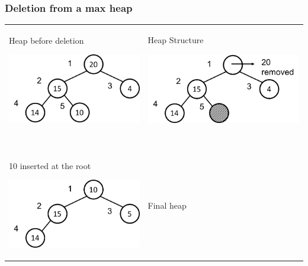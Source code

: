 \documentclass[newPxFont,sthlmFooter,nooffset]{beamer}
\begin{document}
\begin{frame}[t]
  \frametitle{Deletion from a max heap}
  \begin{tabular}{p{} p{}}
Heap before deletion

    \includegraphics[height=0.3\textheight]{./figures/fig14_heap_delete.png}
&    
Heap Structure

    \includegraphics[height=0.3\textheight]{./figures/fig14_heap_delete1.png}
\pause \\
~& ~\\
10 inserted at the root

    \includegraphics[height=0.3\textheight]{./figures/fig14_heap_delete2.png}
&
Final heap


\end{tabular}
\end{frame}
\end{document}
